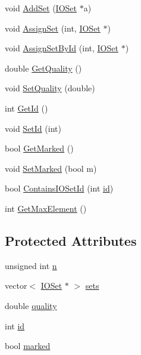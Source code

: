 \begin{DoxyCompactItemize}
\item 
void \hyperlink{class_n_cluster_af4eeecc0717c16ffaa931a0100739f31}{AddSet} (\hyperlink{class_i_o_set}{IOSet} $\ast$a)
\item 
void \hyperlink{class_n_cluster_a7d16c9515b311e4b734a53e15f6f499c}{AssignSet} (int, \hyperlink{class_i_o_set}{IOSet} $\ast$)
\item 
void \hyperlink{class_n_cluster_a7d4e59bbd60c5f62fc1896ce472d1e27}{AssignSetById} (int, \hyperlink{class_i_o_set}{IOSet} $\ast$)
\item 
double \hyperlink{class_n_cluster_aad3afb3c6ca495bd69fe0593455ca785}{GetQuality} ()
\item 
void \hyperlink{class_n_cluster_abf7185a77e66f15d4ff3b400d51d1064}{SetQuality} (double)
\item 
int \hyperlink{class_n_cluster_a185204e735f03d9670855e0767592149}{GetId} ()
\item 
void \hyperlink{class_n_cluster_a62df66a6ed98f118dcdfebe3dc1fced5}{SetId} (int)
\item 
bool \hyperlink{class_n_cluster_a81e298f10335141a1257d29dc4c2e705}{GetMarked} ()
\item 
void \hyperlink{class_n_cluster_abb8e5da62c63785a3ac9f4ab3aad207e}{SetMarked} (bool m)
\item 
bool \hyperlink{class_n_cluster_acf1d8f02e7b8ec537225e896ae26534c}{ContainsIOSetId} (int \hyperlink{class_n_cluster_a9360cadd4e338b91de61f86997acc890}{id})
\item 
int \hyperlink{class_n_cluster_a35ad64188494aec6b0b5a255217ba11b}{GetMaxElement} ()
\end{DoxyCompactItemize}
\subsection*{Protected Attributes}
\begin{DoxyCompactItemize}
\item 
unsigned int \hyperlink{class_n_cluster_a926e474ba279516160b52ab36d208a69}{n}
\item 
vector$<$ \hyperlink{class_i_o_set}{IOSet} $\ast$ $>$ \hyperlink{class_n_cluster_a2333af10251a6a884395aab57b9fa400}{sets}
\item 
double \hyperlink{class_n_cluster_a9e0aa868b02c27e6c282f9633a135aa9}{quality}
\item 
int \hyperlink{class_n_cluster_a9360cadd4e338b91de61f86997acc890}{id}
\item 
bool \hyperlink{class_n_cluster_a89a39f622490f47ed6283b17fe1d0f44}{marked}
\end{DoxyCompactItemize}


